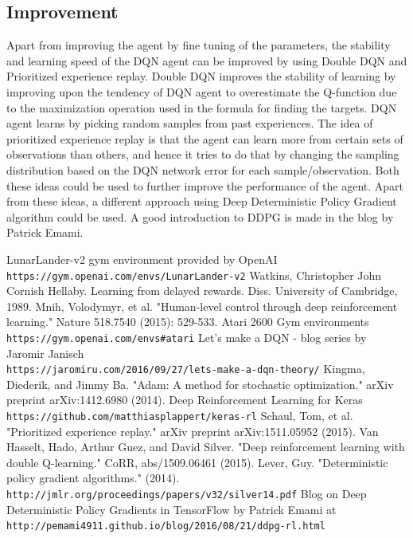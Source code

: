 \documentclass{article}
\begin{document}
\subsection*{Improvement}
Apart from improving the agent by fine tuning of the parameters, the stability and learning speed of the DQN agent can be improved by using Double DQN\cite{doubleq} and Prioritized experience replay\cite{prio}. Double DQN improves the stability of learning by improving upon the tendency of DQN agent to overestimate the Q-function due to the maximization operation used in the formula for finding the targets. DQN agent learns by picking random samples from past experiences. The idea of prioritized experience replay is that the agent can learn more from certain sets of observations than others, and hence it tries to do that by changing the sampling distribution based on the DQN network error for each sample/observation. Both these ideas could be used to further improve the performance of the agent. Apart from these ideas, a different approach using Deep Deterministic Policy Gradient\cite{DDPG} algorithm could be used. A good introduction to DDPG is made in the blog\cite{DDPGblog} by Patrick Emami.
\begin{thebibliography}{}
LunarLander-v2 gym environment provided by OpenAI\\ \texttt{https://gym.openai.com/envs/LunarLander-v2}
Watkins, Christopher John Cornish Hellaby. Learning from delayed rewards. Diss. University of Cambridge, 1989.
Mnih, Volodymyr, et al. "Human-level control through deep reinforcement learning." Nature 518.7540 (2015): 529-533.
Atari 2600 Gym environments\\ \texttt{https://gym.openai.com/envs\#atari}
Let’s make a DQN - blog series by Jaromir Janisch\\\texttt{https://jaromiru.com/2016/09/27/lets-make-a-dqn-theory/}
Kingma, Diederik, and Jimmy Ba. "Adam: A method for stochastic optimization." arXiv preprint arXiv:1412.6980 (2014).
Deep Reinforcement Learning for Keras\\\texttt{https://github.com/matthiasplappert/keras-rl}
Schaul, Tom, et al. "Prioritized experience replay." arXiv preprint arXiv:1511.05952 (2015).
Van Hasselt, Hado, Arthur Guez, and David Silver. "Deep reinforcement learning with double Q-learning." CoRR, abs/1509.06461 (2015).
Lever, Guy. "Deterministic policy gradient algorithms." (2014).\\\texttt{http://jmlr.org/proceedings/papers/v32/silver14.pdf}
Blog on Deep Deterministic Policy Gradients in TensorFlow by Patrick Emami at\\\texttt{http://pemami4911.github.io/blog/2016/08/21/ddpg-rl.html}
\end{thebibliography}
\end{document}
